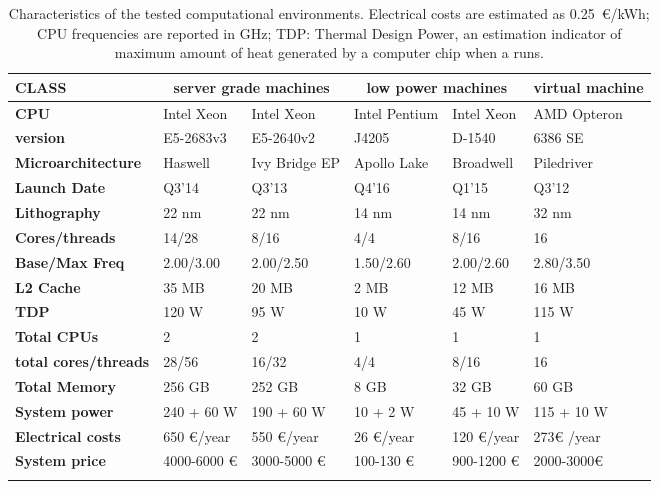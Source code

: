 \documentclass{standalone}
\begin{document}
\begin{table*}
\hspace{-.75cm}
\begin{tabular}{llllll}
\hline \rowcolor{darkgrayrow}
\textbf{CLASS} & \multicolumn{2}{c}{\textbf{server grade machines}} & \multicolumn{2}{c}{\textbf{low power machines}} & \textbf{virtual machine}\\
\hline
\textbf{CPU}                 & Intel Xeon  & Intel Xeon    & Intel Pentium & Intel Xeon  & AMD Opteron \\
\textbf{version}             & E5-2683v3   & E5-2640v2     & J4205         & D-1540      & 6386 SE     \\
\textbf{Microarchitecture}   & Haswell     & Ivy Bridge EP & Apollo Lake   & Broadwell   & Piledriver  \\
\textbf{Launch Date}         & Q3'14       & Q3'13         & Q4'16         & Q1'15       & Q3'12       \\
\textbf{Lithography}         & 22 nm       & 22 nm         & 14 nm         & 14 nm       & 32 nm       \\
\textbf{Cores/threads}       & 14/28       & 8/16          & 4/4           & 8/16        & 16          \\
\textbf{Base/Max Freq}       & 2.00/3.00   & 2.00/2.50     & 1.50/2.60     & 2.00/2.60   & 2.80/3.50   \\
\textbf{L2 Cache}            & 35 MB       & 20 MB         & 2 MB          & 12 MB       & 16 MB       \\
\textbf{TDP}                 & 120 W       & 95 W          & 10 W          & 45 W        & 115 W       \\
\textbf{Total CPUs}          & 2           & 2             & 1             & 1           & 1           \\
\textbf{total cores/threads} & 28/56       & 16/32         & 4/4           & 8/16        & 16          \\
\textbf{Total Memory}        & 256 GB      & 252 GB        & 8 GB          & 32 GB       & 60 GB       \\
\textbf{System power}        & 240 + 60 W  & 190 + 60 W    & 10 + 2 W      & 45 + 10 W   & 115 + 10 W  \\
\textbf{Electrical costs}    & 650 €/year  & 550 €/year    & 26 €/year     & 120 €/year  & 273€ /year  \\
\textbf{System price}        & 4000-6000 € & 3000-5000 €   & 100-130 €     & 900-1200 €  & 2000-3000€  \\
\hline\\
\end{tabular}
\caption{Characteristics of the tested computational environments.
Electrical costs are estimated as 0.25~€/kWh; CPU frequencies are reported in GHz; TDP: Thermal Design Power, an estimation indicator of maximum amount of heat generated by a computer chip when a  runs.}
\label{tab:node-characteristic}
\end{table*}
\end{document}
